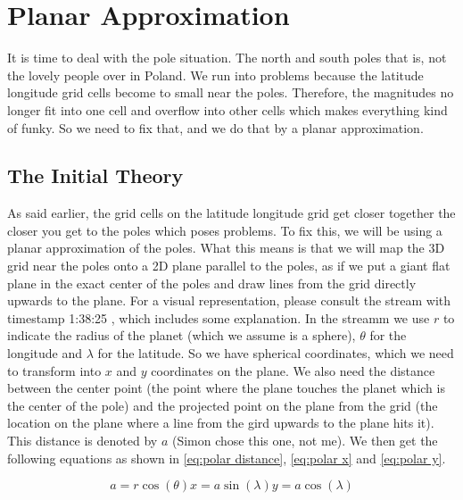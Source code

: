 \section{Planar Approximation}
It is time to deal with the pole situation. The north and south poles that is, not the lovely people over in Poland. We run into problems because the latitude longitude grid cells become to small 
near the poles. Therefore, the magnitudes no longer fit into one cell and overflow into other cells which makes everything kind of funky. So we need to fix that, and we do that by a planar 
approximation. 

\subsection{The Initial Theory}
As said earlier, the grid cells on the latitude longitude grid get closer together the closer you get to the poles which poses problems. To fix this, we will be using a planar approximation of 
the poles. What this means is that we will map the 3D grid near the poles onto a 2D plane parallel to the poles, as if we put a giant flat plane in the exact center of the poles and draw lines
from the grid directly upwards to the plane. For a visual representation, please consult the stream with timestamp 1:38:25 \cite{polarPlane}, which includes some explanation. In the streamm we
use $r$ to indicate the radius of the planet (which we assume is a sphere), $\theta$ for the longitude and $\lambda$ for the latitude. So we have spherical coordinates, which we need to transform
into $x$ and $y$ coordinates on the plane. We also need the distance between the center point (the point where the plane touches the planet which is the center of the pole) and the projected 
point on the plane from the grid (the location on the plane where a line from the gird upwards to the plane hits it). This distance is denoted by $a$ (Simon chose this one, not me). We then get 
the following equations as shown in \autoref{eq:polar distance}, \autoref{eq:polar x} and \autoref{eq:polar y}. 

\begin{subequations}
    \begin{equation}
        a = r \cos(\theta)
        \label{eq:polar distance}
    \end{equation}
    \begin{equation}
        x = a \sin(\lambda)
        \label{eq:polar x}
    \end{equation}
    \begin{equation}
        y = a \cos(\lambda)
        \label{eq:polar y}
    \end{equation}
\end{subequations}

